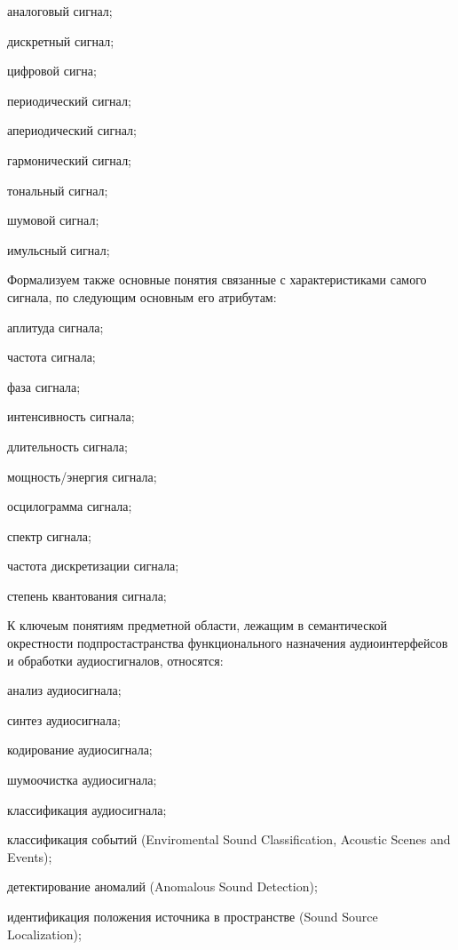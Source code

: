 \begin{textitemize}    
    \item аналоговый сигнал;
    \item дискретный сигнал;
    \item цифровой сигна;
    \item периодический сигнал;
    \item апериодический сигнал;
    \item гармонический сигнал;
    \item тональный сигнал;
    \item шумовой сигнал;
    \item имульсный сигнал;
\end{textitemize}

Формализуем также основные понятия связанные с характеристиками самого сигнала, по следующим основным его атрибутам:
\begin{textitemize}  
    \item аплитуда сигнала;
    \item частота сигнала;
    \item фаза сигнала;
    \item интенсивность сигнала;
    \item длительность сигнала;
    \item мощность/энергия сигнала;
    \item осцилограмма сигнала;
    \item спектр сигнала;
    \item частота дискретизации сигнала;
    \item степень квантования сигнала;
\end{textitemize}

К ключеым понятиям предметной области, лежащим в семантической окрестности подпростастранства функционального назначения аудиоинтерфейсов и обработки аудиосгигналов, относятся:
\begin{textitemize}    
    \item анализ аудиосигнала;
    \item синтез аудиосигнала;
    \item кодирование аудиосигнала;
    \item шумоочистка аудиосигнала;
    \item классификация аудиосигнала;
    \item классификация событий (Enviromental Sound Classification, Acoustic Scenes and Events);
    \item детектирование аномалий (Anomalous Sound Detection);
    \item идентификация положения источника в пространстве (Sound Source Localization);
\end{textitemize}

